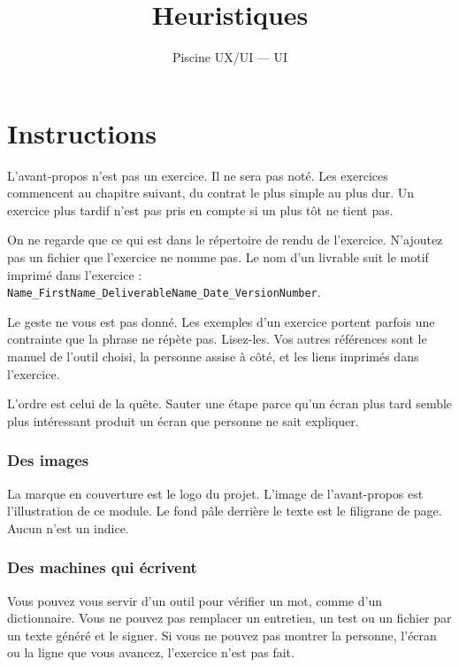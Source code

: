 \documentclass{training}
\begin{document}
\title{Heuristiques}
\subtitle{Piscine UX/UI --- UI}
\maketitle

\newpage
\tableofcontents
\newpage


\chapter{Instructions}

L'avant-propos n'est pas un exercice. Il ne sera pas noté. Les exercices commencent au chapitre suivant, du contrat le plus simple au plus dur. Un exercice plus tardif n'est pas pris en compte si un plus tôt ne tient pas.

On ne regarde que ce qui est dans le répertoire de rendu de l'exercice. N'ajoutez pas un fichier que l'exercice ne nomme pas. Le nom d'un livrable suit le motif imprimé dans l'exercice : \texttt{Name\_FirstName\_DeliverableName\_Date\_VersionNumber}.

Le geste ne vous est pas donné. Les exemples d'un exercice portent parfois une contrainte que la phrase ne répète pas. Lisez-les. Vos autres références sont le manuel de l'outil choisi, la personne assise à côté, et les liens imprimés dans l'exercice.

L'ordre est celui de la quête. Sauter une étape parce qu'un écran plus tard semble plus intéressant produit un écran que personne ne sait expliquer.

\subsection*{Des images}

La marque en couverture est le logo du projet. L'image de l'avant-propos est l'illustration de ce module. Le fond pâle derrière le texte est le filigrane de page. Aucun n'est un indice.

\subsection*{Des machines qui écrivent}

Vous pouvez vous servir d'un outil pour vérifier un mot, comme d'un dictionnaire. Vous ne pouvez pas remplacer un entretien, un test ou un fichier par un texte généré et le signer. Si vous ne pouvez pas montrer la personne, l'écran ou la ligne que vous avancez, l'exercice n'est pas fait.
\end{document}
